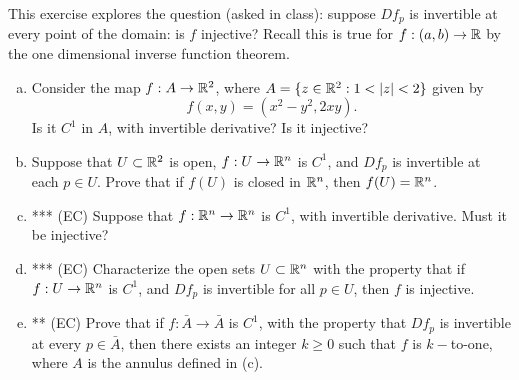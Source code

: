 \documentclass[a4paper, 12pt]{article}
\begin{document}
\begin{problem} 
This exercise explores the question (asked in class): suppose $Df_p$ is invertible at every point of the domain: is $f$ injective? Recall this is true for $f: (a, b) \to \mathbb{R}$ by the one dimensional inverse function theorem.
\begin{enumerate} [(a)]
    \item Consider the map $f: A \to \mathbb{R}^2$, where $A = \{z \in \mathbb{R}^2: 1 < |z| < 2\}$ given by \[
              f(x, y) = (x^2 - y^2, 2xy).
          \]
    Is it $C^1$ in $A$, with invertible derivative? Is it injective?
    \item Suppose that $U \subset \mathbb{R}^2$ is open, $f: U \to \mathbb{R}^n$ is $C^1$, and $Df_p$ is invertible at each $p \in U$. Prove that if $f(U)$ is closed in $\mathbb{R}^n$, then $f(U) = \mathbb{R}^n$.
    \item *** (EC) Suppose that $f: \mathbb{R}^n \to \mathbb{R}^n$ is $C^1$, with invertible derivative. Must it be injective?
    \item *** (EC) Characterize the open sets $U \subset \mathbb{R}^n$ with the property that if $f: U \to \mathbb{R}^n$ is $C^1$, and $Df_p$ is invertible for all $p \in U$, then $f$ is injective.
    \item ** (EC) Prove that if $f: \bar{A} \to \bar{A}$ is $C^1$, with the property that $Df_p$ is invertible at every $p \in \bar{A}$, then there exists an integer $k \geq 0$ such that $f$ is $k-$to-one, where $A$ is the annulus defined in (c).
\end{enumerate}
\end{problem}
\end{document}

